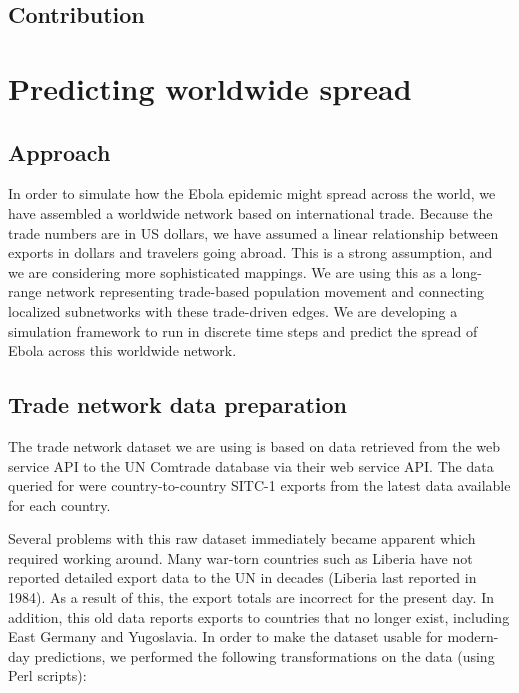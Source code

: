 \documentclass[10pt, journal,onecolumn]{IEEEtran}
\begin{document}
\subsection*{\textbf{Contribution}}




\section{Predicting worldwide spread}
\label{sec:Worldwide}

\subsection*{\textbf{Approach}}
In order to simulate how the Ebola epidemic might spread across the world, we have assembled a
worldwide network based on international trade. Because the trade numbers are in US dollars,
we have assumed a linear relationship between exports in dollars and travelers going abroad.
This is a strong assumption, and we are considering more sophisticated mappings.
We are using this as a long-range network representing trade-based population movement and
connecting localized subnetworks with these trade-driven edges. We are developing a simulation
framework to run in discrete time steps and predict the spread of Ebola across this worldwide network.

\subsection*{\textbf{Trade network data preparation}}

The trade network dataset we are using is based on data retrieved from the web service API to the
UN Comtrade database \citep{uncomtradedata} via their web service API.
The data queried for were country-to-country SITC-1 exports from the latest data available
for each country.

Several problems with this raw dataset immediately became apparent which required working around.
Many war-torn countries such as Liberia have not reported detailed export data
to the UN in decades (Liberia last reported in 1984). As a result of this, the export totals
are incorrect for the present day. In addition, this old data reports exports to countries that
no longer exist, including East Germany and Yugoslavia. In order to make the dataset usable for
modern-day predictions, we performed the following transformations on the data (using Perl scripts):
\end{document}

